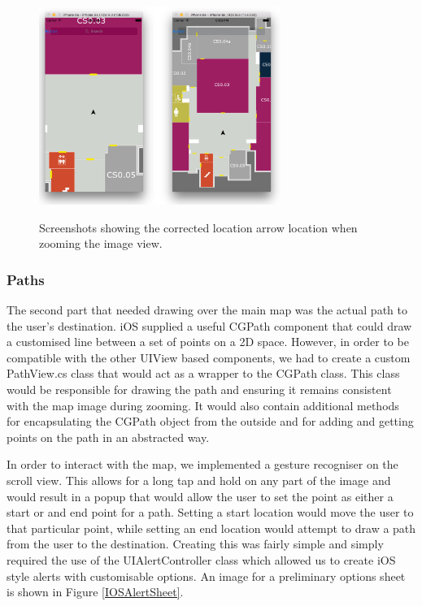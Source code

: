 \documentclass[12pt,a4paper]{report}
\begin{document}
\begin{figure}[]
\centering
\includegraphics[width=0.7\textwidth]{images-implementation/iOSZoomWorking.png}
\label{IOSZoomWorking}
\caption{Screenshots showing the corrected location arrow location when zooming the image view.}
\end{figure}

\subsubsection{Paths}

The second part that needed drawing over the main map was the actual path to the user's destination. iOS supplied a useful CGPath component that could draw a customised line between a set of points on a 2D space. However, in order to be compatible with the other UIView based components, we had to create a custom PathView.cs class that would act as a wrapper to the CGPath class. This class would be responsible for drawing the path and ensuring it remains consistent with the map image during zooming. It would also contain additional methods for encapsulating the CGPath object from the outside and for adding and getting points on the path in an abstracted way. 

In order to interact with the map, we implemented a gesture recogniser on the scroll view. This allows for a long tap and hold on any part of the image and would result in a popup that would allow the user to set the point as either a start or and end point for a path. Setting a start location would move the user to that particular point, while setting an end location would attempt to draw a path from the user to the destination. Creating this was fairly simple and simply required the use of the UIAlertController class which allowed us to create iOS style alerts with customisable options. An image for a preliminary options sheet is shown in Figure \ref{IOSAlertSheet}.
\end{document}
